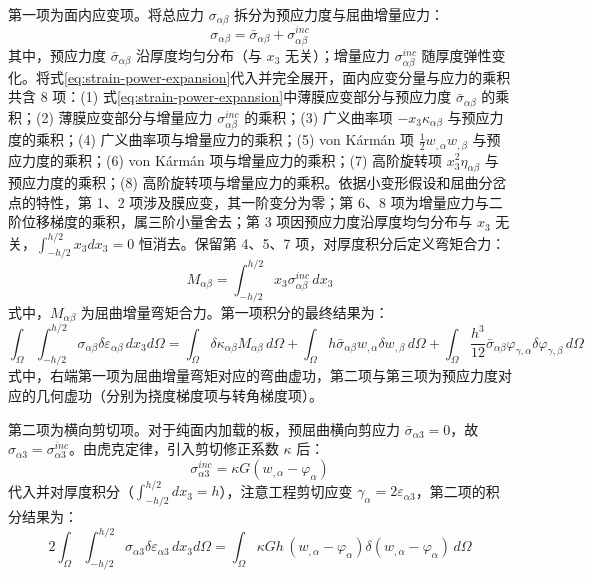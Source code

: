 第一项为面内应变项。将总应力 $\sigma_{\alpha\beta}$ 拆分为预应力度与屈曲增量应力：
\begin{equation}
\sigma_{\alpha\beta} = \bar{\sigma}_{\alpha\beta} + \sigma_{\alpha\beta}^{inc}
\label{eq:stress-decomposition}
\end{equation}
其中，预应力度 $\bar{\sigma}_{\alpha\beta}$ 沿厚度均匀分布（与 $x_3$ 无关）；增量应力 $\sigma_{\alpha\beta}^{inc}$ 随厚度弹性变化。将式\eqref{eq:strain-power-expansion}代入并完全展开，面内应变分量与应力的乘积共含 8 项：(1) 式\eqref{eq:strain-power-expansion}中薄膜应变部分与预应力度 $\bar{\sigma}_{\alpha\beta}$ 的乘积；(2) 薄膜应变部分与增量应力 $\sigma_{\alpha\beta}^{inc}$ 的乘积；(3) 广义曲率项 $-x_3\kappa_{\alpha\beta}$ 与预应力度的乘积；(4) 广义曲率项与增量应力的乘积；(5) von K\'arm\'an 项 $\frac{1}{2}w_{,\alpha}w_{,\beta}$ 与预应力度的乘积；(6) von K\'arm\'an 项与增量应力的乘积；(7) 高阶旋转项 $x_3^2\eta_{\alpha\beta}$ 与预应力度的乘积；(8) 高阶旋转项与增量应力的乘积。依据小变形假设和屈曲分岔点的特性，第 1、2 项涉及膜应变，其一阶变分为零；第 6、8 项为增量应力与二阶位移梯度的乘积，属三阶小量舍去；第 3 项因预应力度沿厚度均匀分布与 $x_3$ 无关，$\int_{-h/2}^{h/2} x_3 dx_3 = 0$ 恒消去。保留第 4、5、7 项，对厚度积分后定义弯矩合力：
\begin{equation}
M_{\alpha\beta} = \int_{-h/2}^{h/2} x_3 \sigma_{\alpha\beta}^{inc}\, dx_3
\label{eq:moment-resultant-inc}
\end{equation}
式中，$M_{\alpha\beta}$ 为屈曲增量弯矩合力。第一项积分的最终结果为：
\begin{equation}
\int_\Omega\int_{-h/2}^{h/2} \sigma_{\alpha\beta}\delta\varepsilon_{\alpha\beta}\, dx_3 d\Omega = \int_\Omega \delta\kappa_{\alpha\beta}M_{\alpha\beta}\, d\Omega + \int_\Omega h\bar{\sigma}_{\alpha\beta}w_{,\alpha}\delta w_{,\beta}\, d\Omega + \int_\Omega \frac{h^3}{12}\bar{\sigma}_{\alpha\beta}\varphi_{\gamma,\alpha}\delta\varphi_{\gamma,\beta}\, d\Omega
\label{eq:inplane-term-result}
\end{equation}
式中，右端第一项为屈曲增量弯矩对应的弯曲虚功，第二项与第三项为预应力度对应的几何虚功（分别为挠度梯度项与转角梯度项）。

第二项为横向剪切项。对于纯面内加载的板，预屈曲横向剪应力 $\bar{\sigma}_{\alpha 3} = 0$，故 $\sigma_{\alpha 3} = \sigma_{\alpha 3}^{inc}$。由虎克定律，引入剪切修正系数 $\kappa$ 后：
\begin{equation}
\sigma_{\alpha 3}^{inc} = \kappa G(w_{,\alpha} - \varphi_\alpha)
\label{eq:shear-stress-inc}
\end{equation}
代入并对厚度积分（$\int_{-h/2}^{h/2} dx_3 = h$），注意工程剪切应变 $\gamma_\alpha = 2\varepsilon_{\alpha 3}$，第二项的积分结果为：
\begin{equation}
2\int_\Omega\int_{-h/2}^{h/2} \sigma_{\alpha 3}\delta\varepsilon_{\alpha 3}\, dx_3 d\Omega = \int_\Omega \kappa G h\,(w_{,\alpha} - \varphi_\alpha)\delta(w_{,\alpha} - \varphi_\alpha)\, d\Omega
\label{eq:shear-term-result}
\end{equation}

